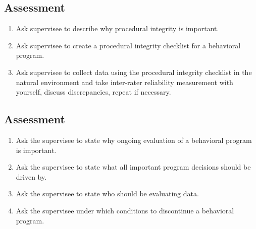 \subsection{Assessment}
\begin{enumerate}
\item Ask supervisee to describe why procedural integrity is important.
\item Ask supervisee to create a procedural integrity checklist for a behavioral program.
\item Ask supervisee to collect data using the procedural integrity checklist in the natural environment and take inter-rater reliability measurement with yourself, discuss discrepancies, repeat if necessary.
\end{enumerate}
%
\subsection{Assessment}
\begin{enumerate}
\item Ask the supervisee to state why ongoing evaluation of a behavioral program is important.
\item Ask the supervisee to state what all important program decisions should be driven by.
\item Ask the supervisee to state who should be evaluating data.
\item Ask the supervisee under which conditions to discontinue a behavioral program.
%
\end{enumerate}
%
